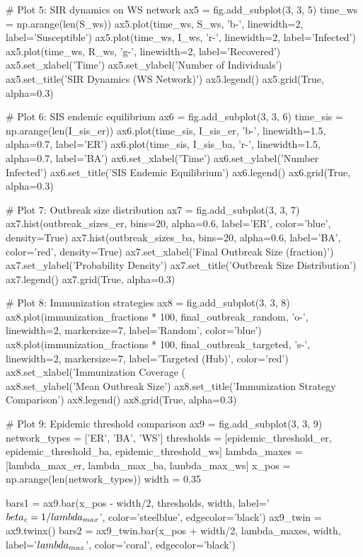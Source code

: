 \documentclass[a4paper, 11pt]{article}
\begin{document}
\begin{pycode}
# Plot 5: SIR dynamics on WS network
ax5 = fig.add_subplot(3, 3, 5)
time_ws = np.arange(len(S_ws))
ax5.plot(time_ws, S_ws, 'b-', linewidth=2, label='Susceptible')
ax5.plot(time_ws, I_ws, 'r-', linewidth=2, label='Infected')
ax5.plot(time_ws, R_ws, 'g-', linewidth=2, label='Recovered')
ax5.set_xlabel('Time')
ax5.set_ylabel('Number of Individuals')
ax5.set_title('SIR Dynamics (WS Network)')
ax5.legend()
ax5.grid(True, alpha=0.3)

# Plot 6: SIS endemic equilibrium
ax6 = fig.add_subplot(3, 3, 6)
time_sis = np.arange(len(I_sis_er))
ax6.plot(time_sis, I_sis_er, 'b-', linewidth=1.5, alpha=0.7, label='ER')
ax6.plot(time_sis, I_sis_ba, 'r-', linewidth=1.5, alpha=0.7, label='BA')
ax6.set_xlabel('Time')
ax6.set_ylabel('Number Infected')
ax6.set_title('SIS Endemic Equilibrium')
ax6.legend()
ax6.grid(True, alpha=0.3)

# Plot 7: Outbreak size distribution
ax7 = fig.add_subplot(3, 3, 7)
ax7.hist(outbreak_sizes_er, bins=20, alpha=0.6, label='ER', color='blue', density=True)
ax7.hist(outbreak_sizes_ba, bins=20, alpha=0.6, label='BA', color='red', density=True)
ax7.set_xlabel('Final Outbreak Size (fraction)')
ax7.set_ylabel('Probability Density')
ax7.set_title('Outbreak Size Distribution')
ax7.legend()
ax7.grid(True, alpha=0.3)

# Plot 8: Immunization strategies
ax8 = fig.add_subplot(3, 3, 8)
ax8.plot(immunization_fractions * 100, final_outbreak_random, 'o-', linewidth=2,
         markersize=7, label='Random', color='blue')
ax8.plot(immunization_fractions * 100, final_outbreak_targeted, 's-', linewidth=2,
         markersize=7, label='Targeted (Hub)', color='red')
ax8.set_xlabel('Immunization Coverage (\\%
ax8.set_ylabel('Mean Outbreak Size')
ax8.set_title('Immunization Strategy Comparison')
ax8.legend()
ax8.grid(True, alpha=0.3)

# Plot 9: Epidemic threshold comparison
ax9 = fig.add_subplot(3, 3, 9)
network_types = ['ER', 'BA', 'WS']
thresholds = [epidemic_threshold_er, epidemic_threshold_ba, epidemic_threshold_ws]
lambda_maxes = [lambda_max_er, lambda_max_ba, lambda_max_ws]
x_pos = np.arange(len(network_types))
width = 0.35

bars1 = ax9.bar(x_pos - width/2, thresholds, width, label='$\\beta_c = 1/\\lambda_{max}$',
                color='steelblue', edgecolor='black')
ax9_twin = ax9.twinx()
bars2 = ax9_twin.bar(x_pos + width/2, lambda_maxes, width, label='$\\lambda_{max}$',
                     color='coral', edgecolor='black')


\end{pycode}
\end{document}
